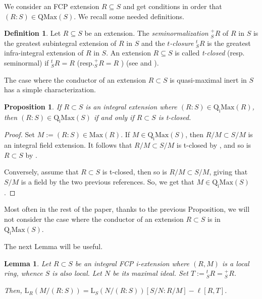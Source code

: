 \documentclass[12pt,leqno]{amsart}
\newtheorem{lemma}[theorem]{Lemma}
\newtheorem{proposition}[theorem]{Proposition}
\theoremstyle{definition}
\newtheorem{definition}[theorem]{Definition}
\begin{document}
We consider an FCP extension $R\subseteq S$ and get conditions in order that $(R:S)\in\mathrm{QMax}(S)$. We recall some needed definitions.
 
\begin{definition}\label{4.60} Let $R\subseteq S$ be an extension. The {\it seminormalization} ${}_S^+R$ of $R$ in $S$ is the greatest subintegral extension of $R$ in $S$ and the {\it $t$-closure} ${}_S^tR$ is the greatest infra-integral extension of $R$ in $S$. An extension $R\subseteq S$ is called {\it t-closed} (resp. seminormal) if ${}_S^tR=R$ (resp.${}_S^+R=R$ )                   
  (see \cite{Pic 1} and \cite{S}).
  \end{definition}
  
The case where the conductor of an extension $R\subset S$ is quasi-maximal inert  in $S$ has  a simple characterization. 

\begin{proposition}\label{4.7} If $R\subset S$ is an integral extension where $(R:S)\in\mathrm{Q_iMax}(R)$, then $(R:S)\in\mathrm{Q_iMax}(S)$ 
if and only if $R\subset S$ is   t-closed.
\end{proposition}
\begin{proof} Set $M:=(R:S)\in\mathrm{Max}(R)$. If $M\in\mathrm{Q_iMax}(S)$, then $R/M\subset S/M$ is an integral field extension. It follows that $ R/M\subset S/M$ is t-closed by \cite[Lemme 3.10]{Pic 1}, and so is $R\subset S$ by \cite[Proposition 2.13]{Pic 171}. 

Conversely, assume that $R\subset S$ is t-closed, then so is $R/M\subset S/M$, giving that $S/M$ is a field by the two previous references. So, we get that $M\in\mathrm{Q_iMax}(S)$.
\end{proof}

Most often in the rest of the paper, thanks to the previous Proposition, we will not consider the case where the conductor of an extension $R\subset S$ is in $\mathrm{Q_iMax}(S)$.
 
 The next Lemma will be useful.
 
\begin{lemma}\label{4.61} Let $R\subset S$ be an integral FCP i-extension where $(R,M)$ is a local ring, whence $S$ is also local. Let $N$ be its  maximal ideal. Set $T:={}_S^tR={}_S^+R$. 
 
Then, $\mathrm{L}_R(M/(R: S))=\mathrm{L}_S(N/(R:S))[S/N:R/M]-\ell[R,T]$.
 \end{lemma}
 
\end{document}

